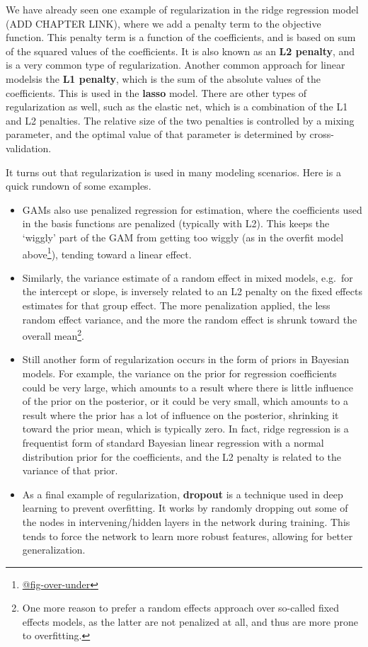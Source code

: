 \documentclass[
  letterpaper,
]{krantz}
\DeclareRobustCommand{\href}[2]{#2\footnote{\url{#1}}}
\begin{document}
We have already seen one example of regularization in the ridge
regression model (ADD CHAPTER LINK), where we add a penalty term to the
objective function. This penalty term is a function of the coefficients,
and is based on sum of the squared values of the coefficients. It is
also known as an \textbf{L2 penalty}, and is a very common type of
regularization. Another common approach for linear modelsis the
\textbf{L1 penalty}, which is the sum of the absolute values of the
coefficients. This is used in the \textbf{lasso} model. There are other
types of regularization as well, such as the elastic net, which is a
combination of the L1 and L2 penalties. The relative size of the two
penalties is controlled by a mixing parameter, and the optimal value of
that parameter is determined by cross-validation.

It turns out that regularization is used in many modeling scenarios.
Here is a quick rundown of some examples.

\begin{itemize}
\item
  GAMs also use penalized regression for estimation, where the
  coefficients used in the basis functions are penalized (typically with
  L2). This keeps the `wiggly' part of the GAM from getting too wiggly
  (as in the \href{@fig-over-under}{overfit model above}), tending
  toward a linear effect.
\item
  Similarly, the variance estimate of a random effect in mixed models,
  e.g.~for the intercept or slope, is inversely related to an L2 penalty
  on the fixed effects estimates for that group effect. The more
  penalization applied, the less random effect variance, and the more
  the random effect is shrunk toward the overall mean\footnote{One more
    reason to prefer a random effects approach over so-called fixed
    effects models, as the latter are not penalized at all, and thus are
    more prone to overfitting.}.
\end{itemize}

\begin{itemize}
\item
  Still another form of regularization occurs in the form of priors in
  Bayesian models. For example, the variance on the prior for regression
  coefficients could be very large, which amounts to a result where
  there is little influence of the prior on the posterior, or it could
  be very small, which amounts to a result where the prior has a lot of
  influence on the posterior, shrinking it toward the prior mean, which
  is typically zero. In fact, ridge regression is a frequentist form of
  standard Bayesian linear regression with a normal distribution prior
  for the coefficients, and the L2 penalty is related to the variance of
  that prior.
\item
  As a final example of regularization, \textbf{dropout} is a technique
  used in deep learning to prevent overfitting. It works by randomly
  dropping out some of the nodes in intervening/hidden layers in the
  network during training. This tends to force the network to learn more
  robust features, allowing for better generalization.
\end{itemize}
\end{document}
